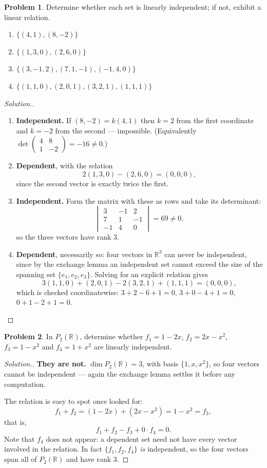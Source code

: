 \documentclass[11pt,a4paper]{article}
\theoremstyle{definition}
\newtheorem{problemx}{Problem}[section]
\newenvironment{problem}{\begin{problemx}}{\end{problemx}}
\newenvironment{solution}
  {\renewcommand{\qedsymbol}{}\begin{proof}[\textit{Solution}.]}
  {\end{proof}}
\begin{document}
\begin{problem}
Determine whether each set is linearly independent; if not, exhibit a linear
relation.
\begin{enumerate}
\item[(a)] $\{(4,1),(8,-2)\}$
\item[(b)] $\{(1,3,0),(2,6,0)\}$
\item[(c)] $\{(3,-1,2),(7,1,-1),(-1,4,0)\}$
\item[(d)] $\{(1,1,0),(2,0,1),(3,2,1),(1,1,1)\}$
\end{enumerate}
\end{problem}
\begin{solution}
\begin{enumerate}
\item[(a)] \textbf{Independent.} If $(8,-2)=k(4,1)$ then $k=2$ from the first
coordinate and $k=-2$ from the second --- impossible. (Equivalently
$\det\begin{pmatrix}4&8\\1&-2\end{pmatrix}=-16\neq 0$.)

\item[(b)] \textbf{Dependent}, with the relation
$$2(1,3,0)-(2,6,0)=(0,0,0),$$
since the second vector is exactly twice the first.

\item[(c)] \textbf{Independent.} Form the matrix with these as rows and take
its determinant:
$$\begin{vmatrix}3&-1&2\\7&1&-1\\-1&4&0\end{vmatrix}=69\neq 0,$$
so the three vectors have rank $3$.

\item[(d)] \textbf{Dependent}, necessarily so: four vectors in $\mathbb{R}^3$
can never be independent, since by the exchange lemma an independent set cannot
exceed the size of the spanning set $\{e_1,e_2,e_3\}$. Solving for an explicit
relation gives
$$3(1,1,0)+(2,0,1)-2(3,2,1)+(1,1,1)=(0,0,0),$$
which is checked coordinatewise: $3+2-6+1=0$, $3+0-4+1=0$, $0+1-2+1=0$.
\end{enumerate}
\end{solution}

\begin{problem}
In $P_2(\mathbb{R})$, determine whether $f_1=1-2x$, $f_2=2x-x^2$,
$f_3=1-x^2$ and $f_4=1+x^2$ are linearly independent.
\end{problem}
\begin{solution}
\textbf{They are not.} $\dim P_2(\mathbb{R})=3$, with basis $\{1,x,x^2\}$, so
four vectors cannot be independent --- again the exchange lemma settles it
before any computation.

The relation is easy to spot once looked for:
$$f_1+f_2=(1-2x)+(2x-x^2)=1-x^2=f_3,$$
that is,
$$f_1+f_2-f_3+0\cdot f_4=0.$$
Note that $f_4$ does not appear: a dependent set need not have every vector
involved in the relation. In fact $\{f_1,f_2,f_4\}$ \emph{is} independent, so
the four vectors span all of $P_2(\mathbb{R})$ and have rank $3$.
\end{solution}
\end{document}
